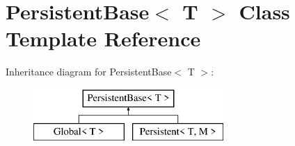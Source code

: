 \hypertarget{class_persistent_base}{}\section{Persistent\+Base$<$ T $>$ Class Template Reference}
\label{class_persistent_base}
Inheritance diagram for Persistent\+Base$<$ T $>$\+:\begin{figure}[H]
\begin{center}
\leavevmode
\includegraphics[height=2.000000cm]{class_persistent_base}
\end{center}
\end{figure}
